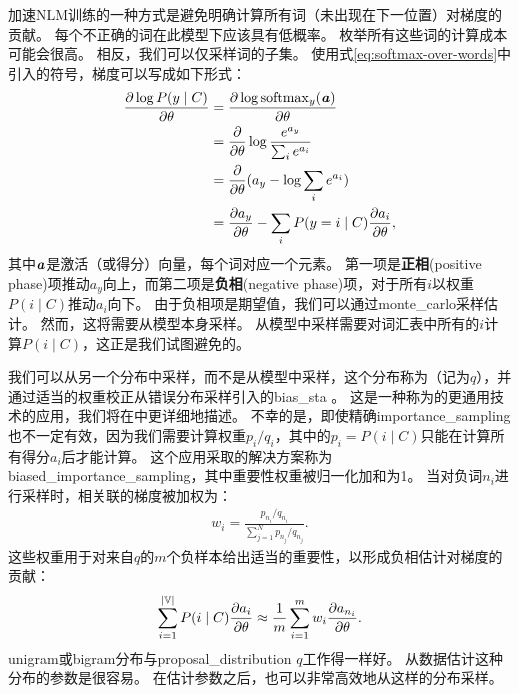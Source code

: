 \subsubsection{}
\label{sec:importance_sampling_chap12}
加速\gls{NLM}训练的一种方式是避免明确计算所有词（未出现在下一位置）对梯度的贡献。
每个不正确的词在此模型下应该具有低概率。
枚举所有这些词的计算成本可能会很高。
相反，我们可以仅采样词的子集。
使用式\eqref{eq:softmax-over-words}中引入的符号，梯度可以写成如下形式：
\begin{align}
 \frac{\partial \log P(y \mid C)}{\partial \theta} &= \frac{\partial \log {\rm softmax}_y(\boldsymbol{\mathit{a}})}{\partial \theta} \\ 
  &= \frac{\partial}{\partial \theta} \log \frac{e^{a_y}}{\sum_i e^{a_i}} \\ 
 &= \frac{\partial}{\partial \theta} (a_y - \log \sum_i e^{a_i}) \\ 
 &= \frac{\partial a_y}{\partial \theta}  - \sum_i P(y = i \mid C) \frac{\partial a_i}{\partial \theta},
\end{align}
其中$\boldsymbol{\mathit{a}}$是激活（或得分）向量，每个词对应一个元素。
第一项是\textbf{正相}(positive phase)项推动$a_y$向上，而第二项是\textbf{负相}(negative phase)项，对于所有$i$以权重$P(i \mid C)$推动$a_i$向下。
由于负相项是期望值，我们可以通过\gls{monte_carlo}采样估计。
然而，这将需要从模型本身采样。
从模型中采样需要对词汇表中所有的$i$计算$P(i \mid C)$，这正是我们试图避免的。

我们可以从另一个分布中采样，而不是从模型中采样，这个分布称为（记为$q$），并通过适当的权重校正从错误分布采样引入的\gls{bias_sta} \citep{Bengio+Senecal-2003-small,Bengio+Senecal-2008}。
这是一种称为的更通用技术的应用，我们将在中更详细地描述。
不幸的是，即使精确\gls{importance_sampling}也不一定有效，因为我们需要计算权重$p_i / q_i$，其中的$p_i = P(i \mid C)$只能在计算所有得分$a_i$后才能计算。
这个应用采取的解决方案称为\gls{biased_importance_sampling}，其中重要性权重被归一化加和为1。
当对负词$n_i$进行采样时，相关联的梯度被加权为：
\begin{align}
  w_i = \frac{p_{n_i} / q_{n_i}}{\sum_{j=1}^N p_{n_j} / q_{n_j}}.
\end{align}
这些权重用于对来自$q$的$m$个负样本给出适当的重要性，以形成负相估计对梯度的贡献：
\begin{align}
  \sum_{i=1}^{|\mathbb{V}|} P(i \mid C) \frac{\partial a_i}{\partial \theta}  \approx \frac{1}{m} \sum_{i=1}^m w_i \frac{\partial a_{n_i}}{\partial \theta}.
  \end{align}
  \gls{unigram}或\gls{bigram}分布与\gls{proposal_distribution} $q$工作得一样好。
从数据估计这种分布的参数是很容易。
在估计参数之后，也可以非常高效地从这样的分布采样。

